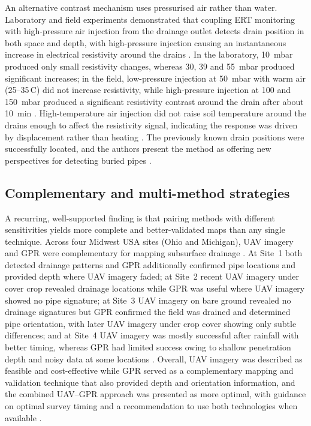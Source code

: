 \documentclass[11pt]{article}
\begin{document}
An alternative contrast mechanism uses pressurised air rather than water. Laboratory and field experiments demonstrated that coupling ERT monitoring with high-pressure air injection from the drainage outlet detects drain position in both space and depth, with high-pressure injection causing an instantaneous increase in electrical resistivity around the drains \parencite{Henine2021}. In the laboratory, 10~mbar produced only small resistivity changes, whereas 30, 39 and 55~mbar produced significant increases; in the field, low-pressure injection at 50~mbar with warm air (25--35\,\textdegree C) did not increase resistivity, while high-pressure injection at 100 and 150~mbar produced a significant resistivity contrast around the drain after about 10~min \parencite{Henine2021}. High-temperature air injection did not raise soil temperature around the drains enough to affect the resistivity signal, indicating the response was driven by displacement rather than heating \parencite{Henine2021}. The previously known drain positions were successfully located, and the authors present the method as offering new perspectives for detecting buried pipes \parencite{Henine2021}.

\subsection{Complementary and multi-method strategies}

A recurring, well-supported finding is that pairing methods with different sensitivities yields more complete and better-validated maps than any single technique. Across four Midwest USA sites (Ohio and Michigan), UAV imagery and GPR were complementary for mapping subsurface drainage \parencite{Koganti2021}. At Site~1 both detected drainage patterns and GPR additionally confirmed pipe locations and provided depth where UAV imagery faded; at Site~2 recent UAV imagery under cover crop revealed drainage locations while GPR was useful where UAV imagery showed no pipe signature; at Site~3 UAV imagery on bare ground revealed no drainage signatures but GPR confirmed the field was drained and determined pipe orientation, with later UAV imagery under crop cover showing only subtle differences; and at Site~4 UAV imagery was mostly successful after rainfall with better timing, whereas GPR had limited success owing to shallow penetration depth and noisy data at some locations \parencite{Koganti2021}. Overall, UAV imagery was described as feasible and cost-effective while GPR served as a complementary mapping and validation technique that also provided depth and orientation information, and the combined UAV--GPR approach was presented as more optimal, with guidance on optimal survey timing and a recommendation to use both technologies when available \parencite{Koganti2021}.
\end{document}
